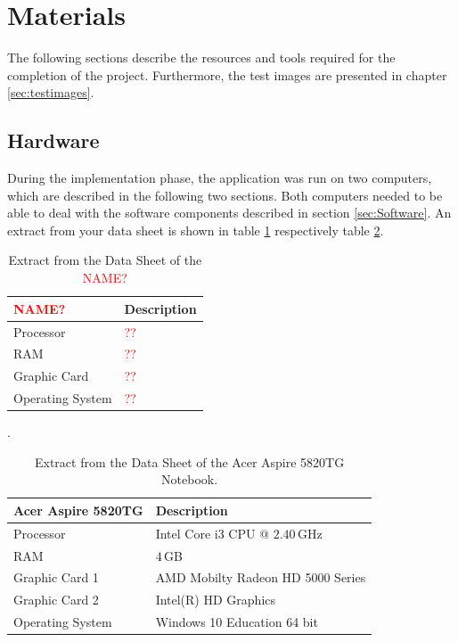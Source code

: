 \section{Materials}\label{sec:Materials}
The following sections describe the resources and tools required for the completion of the project. Furthermore, the test images are presented in chapter \ref{sec:testimages}.


\subsection{Hardware}\label{sec:Hardware}
During the implementation phase, the application was run on two computers, which are described in the following two sections. Both computers needed to be able to deal with the software components described in section \ref{sec:Software}. An extract from your data sheet is shown in table \ref{tab:Computer1} respectively table \ref{tab:Computer2}.


\begin{table}
	\centering
	\begin{tabular}{|l|l|}
		\hline
		\Absatzbox{}
		\textbf{\textcolor{red}{NAME?}}& \textbf{Description} \\
		\hline
		Processor & \textcolor{red}{??} \\
		\hline
		RAM & \textcolor{red}{??}  \\
 		\hline 
		Graphic Card & \textcolor{red}{??} \\
		\hline
		Operating System & \textcolor{red}{??}  \\
		\hline
	\end{tabular}
	\caption[Extract from the Data Sheet of the \textcolor{red}{NAME?}]{Extract from the Data Sheet of the \textcolor{red}{NAME?}}.
	\label{tab:Computer1}
\end{table}

\begin{table}
	\centering
	\begin{tabular}{|l|l|}
		\hline
		\Absatzbox{}
		\textbf{Acer Aspire 5820TG}& \textbf{Description} \\
		\hline
		Processor & Intel Core i3 CPU @ $2.40\,$GHz \\
		\hline
		RAM & $4\,$GB \\
 		\hline 
		Graphic Card 1 & AMD Mobilty Radeon HD 5000 Series\\
		\hline
		Graphic Card 2 & Intel(R) HD Graphics\\
		\hline
		Operating System & Windows 10 Education 64 bit \\
		\hline
	\end{tabular}
	\caption[Extract from the Data Sheet of the Acer Aspire 5820TG Notebook.]{Extract from the Data Sheet of the Acer Aspire 5820TG Notebook.}
	\label{tab:Computer2}
\end{table}


